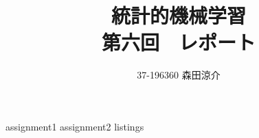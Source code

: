 \documentclass[dvipdfmx, fleqn, titlepage]{jsarticle}
\title{
	統計的機械学習 \\
	第六回　レポート
	}
\author{37-196360 \quad 森田涼介}
\begin{document}
\maketitle
{assignment1}
{assignment2}
\clearpage
{listings}
\end{document}
